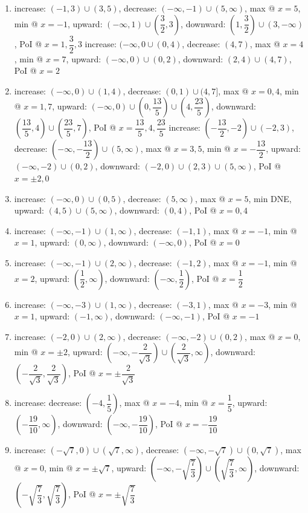 \documentclass{book}
\begin{document}
\begin{appendices}
\begin{enumerate}[!HW!]
\item  increase: $(-1,3)\cup(3,5)$, decrease: $(-\infty,-1)\cup (5,\infty)$, max @ $x=5$, min @ $x=-1$, upward: $(-\infty,1)\cup \left(\dfrac{3}{2},3\right)$, downward: $\left(1,\dfrac{3}{2}\right)\cup(3,-\infty)$, PoI @ $x=1,\dfrac{3}{2}, 3$
\itemspade  increase: $(-\infty,0\cup(0,4)$, decrease: $(4,7)$, max @ $x=4$, min @ $x=7$, upward: $(-\infty,0)\cup (0,2)$, downward: $(2,4)\cup(4,7)$, PoI @ $x=2$
\item  increase: $(-\infty,0)\cup(1,4)$, decrease: $(0,1)\cup(4,7]$, max @ $x=0, 4$, min @ $x=1, 7$, upward: $(-\infty,0)\cup \left(0,\dfrac{13}{5}\right)\cup\left(4,\dfrac{23}{5}\right)$, downward: $\left(\dfrac{13}{5},4\right)\cup\left(\dfrac{23}{5},7\right)$, PoI @ $x=\dfrac{13}{5}, 4, \dfrac{23}{5}$
\itemspade  increase: $\left(-\dfrac{13}{2}, -2\right)\cup(-2,3)$, decrease: $\left(-\infty,-\dfrac{13}{2}\right)\cup(5,\infty)$, max @ $x=3,5$, min @ $x=-\dfrac{13}{2}$, upward: $(-\infty,-2)\cup (0,2)$, downward: $(-2,0)\cup (2,3)\cup(5,\infty)$, PoI @ $x=\pm2,0$
\item increase: $(-\infty,0)\cup(0,5)$, decrease: $(5,\infty)$, max @ $x=5$, min  DNE, upward: $(4,5)\cup (5,\infty)$, downward: $(0,4)$, PoI @ $x=0,4$
\item increase: $(-\infty,-1) \cup (1,\infty)$, decrease: $(-1,1)$, max @ $x = -1$,  min @ $x = 1$, upward: $(0,\infty)$, downward: $(-\infty,0)$, PoI @ $x=0$
\item increase: $(-\infty, -1)\cup (2,\infty)$, decrease: $(-1,2)$, max @ $x = -1$,  min @ $x = 2$, upward: $\left(\dfrac{1}{2},\infty\right)$, downward: $\left(-\infty,\dfrac{1}{2}\right)$, PoI @ $x=\dfrac{1}{2}$
\item  increase: ${(-\infty, -3)\cup (1,\infty)}$, decrease: $(-3,1)$, max @ $x = -3$,  min @ $x = 1$, upward: $(-1,\infty)$, downward: $(-\infty,-1)$, PoI @ $x=-1$
\item  increase: $(-2,0) \cup (2,\infty)$, decrease: $(-\infty,-2)\cup(0,2)$, max @ $x = 0$,  min @ $x = \pm2$, upward: $\left(-\infty,-\dfrac{2}{\sqrt{3}}\right)\cup\left(\dfrac{2}{\sqrt{3}}, \infty\right)$, downward: $\left(-\dfrac{2}{\sqrt{3}},\dfrac{2}{\sqrt{3}}\right)$, PoI @ $x=\pm\dfrac{2}{\sqrt{3}}$
\item  increase:  decrease: $\left(-4,\dfrac{1}{5}\right)$, max @ $x=-4$,  min @ $x=\dfrac{1}{5}$, upward: $\left(-\dfrac{19}{10},\infty\right)$, downward: $\left(-\infty,-\dfrac{19}{10}\right)$, PoI @ $x=-\dfrac{19}{10}$
\item  increase: $(-\sqrt{7}, 0) \cup (\sqrt{7}, \infty)$, decrease: $(-\infty, -\sqrt{7}) \cup (0, \sqrt{7})$, max @ $x=0$,  min @ $x=\pm\sqrt{7}$, upward: $\left(-\infty,-\sqrt{\dfrac{7}{3}}\right)\cup\left(\sqrt{\dfrac{7}{3}}, \infty\right)$, downward: $\left(-\sqrt{\dfrac{7}{3}},\sqrt{\dfrac{7}{3}}\right)$, PoI @ $x=\pm\sqrt{\dfrac{7}{3}}$

\end{enumerate}
\end{appendices}
\end{document}
